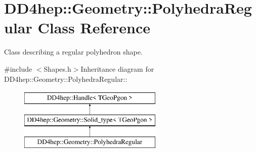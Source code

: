 \hypertarget{class_d_d4hep_1_1_geometry_1_1_polyhedra_regular}{
\section{DD4hep::Geometry::PolyhedraRegular Class Reference}
\label{class_d_d4hep_1_1_geometry_1_1_polyhedra_regular}
}


Class describing a regular polyhedron shape.  


{\ttfamily \#include $<$Shapes.h$>$}Inheritance diagram for DD4hep::Geometry::PolyhedraRegular::\begin{figure}[H]
\begin{center}
\leavevmode
\includegraphics[height=3cm]{class_d_d4hep_1_1_geometry_1_1_polyhedra_regular}
\end{center}
\end{figure}
